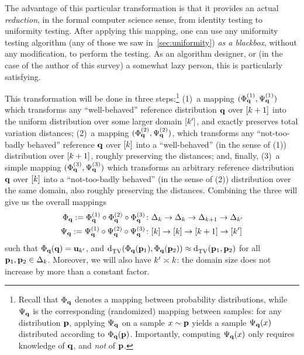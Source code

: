 The advantage of this particular transformation is that it provides an actual \emph{reduction}, in the formal computer science sense, from identity testing to uniformity testing. After applying this mapping, one can use any uniformity testing algorithm (\eg any of those we saw in~\cref{sec:uniformity}) \emph{as a blackbox}, without any modification, to perform the testing. As an algorithm designer, or (in the case of the author of this survey) a somewhat lazy person, this is particularly satisfying.

This transformation will be done in three steps:\footnote{Recall that $\Phi_{\mathbf{q}}$ denotes a mapping between probability distributions, while $\Psi_{\mathbf{q}}$ is the corresponding (randomized) mapping between samples: for any distribution $\mathbf{p}$, applying $\Psi_{\mathbf{q}}$ on a sample $x\sim\mathbf{p}$ yields a sample $\Psi_{\mathbf{q}}(x)$ distributed according to $\Phi_{\mathbf{q}}(\mathbf{p})$. Importantly, computing $\Psi_{\mathbf{q}}(x)$ only requires knowledge of $\mathbf{q}$, and \emph{not} of $\mathbf{p}$.} (1)~a mapping $(\Phi^{(1)}_{\mathbf{q}},\Psi^{(1)}_{\mathbf{q}})$ which transforms any ``well-behaved'' reference distribution $\mathbf{q}$ over $[k+1]$ into the uniform distribution over some larger domain $[k']$, and exactly preserves total variation distances; (2)~a mapping $(\Phi^{(2)}_{\mathbf{q}},\Psi^{(2)}_{\mathbf{q}})$, which transforms any ``not-too-badly behaved'' reference $\mathbf{q}$ over $[k]$ into a ``well-behaved'' (in the sense of (1)) distribution over $[k+1]$, roughly preserving the distances; and, finally, (3)~a simple mapping $(\Phi^{(3)}_{\mathbf{q}},\Psi^{(3)}_{\mathbf{q}})$ which transforms an arbitrary reference distribution $\mathbf{q}$ over $[k]$ into a ``not-too-badly behaved'' (in the sense of (2)) distribution over the same domain, also roughly preserving the distances. Combining the three will give us the overall mappings
\begin{equation}
	\label{eq:l1:reduction:composition}
	\begin{aligned}
		\Phi_{\mathbf{q}}:= \Phi^{(1)}_{\mathbf{q}}\circ\Phi^{(2)}_{\mathbf{q}}\circ\Phi^{(3)}_{\mathbf{q}} &\colon \Delta_{k} \to\Delta_{k} \to\Delta_{k+1} \to \Delta_{k'} \\
		\Psi_{\mathbf{q}}:= \Psi^{(1)}_{\mathbf{q}}\circ\Psi^{(2)}_{\mathbf{q}}\circ\Psi^{(3)}_{\mathbf{q}} &\colon [k] \to[k] \to[k+1] \to [k']
	\end{aligned}
\end{equation}
such that $\Phi_{\mathbf{q}}(\mathbf{q})=\mathbf{u}_{ k' } $, and $\totalvardist{\Phi_\q(\p_1)}{\Phi_\q(\p_2)} \approx \totalvardist{\p_1}{\p_2}$ for all $\mathbf{p}_1,\mathbf{p}_2\in\Delta_{k}$. Moreover, we will also have $k'\asymp k$: the domain size does not increase by more than a constant factor.


